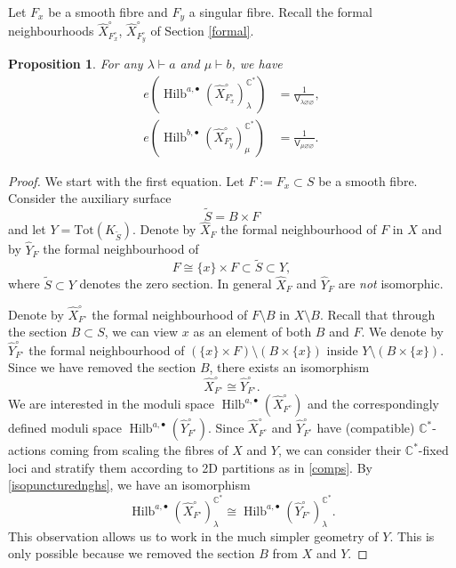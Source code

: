 \documentclass{amsart}
\newtheorem{proposition}[theorem]{Proposition}
\theoremstyle{definition}
\newcommand{\CC} {\mathbb{C}}          %
\newcommand{\sfV}{\mathsf{V}}
\newcommand{\Hilb}{\operatorname{Hilb}}
\newcommand{\Xhat}{\widehat{X}}
\begin{document}
Let $F_x$ be a smooth fibre and $F_y$ a singular fibre. Recall the formal neighbourhoods $\Xhat ^{\circ}_{F_{x}^{\circ}}$,  $\Xhat ^{\circ}_{F_{y}^{\circ}}$ of Section \ref{formal}.
\begin{proposition} \label{vertex2}
For any $\lambda \vdash a$ and $\mu \vdash b$, we have
\begin{align*}
e(\Hilb^{a,\bullet}(\Xhat ^{\circ}_{F_{x}^{\circ}})_{\lambda}^{\CC^*}) &= \frac{1}{\sfV_{\lambda\varnothing\varnothing}}, \\
e(\Hilb^{b,\bullet}(\Xhat ^{\circ}_{F_{y}^{\circ}})_{\mu}^{\CC^*}) &= \frac{1}{\sfV_{\mu\varnothing\varnothing}}.
\end{align*}
\end{proposition}
\begin{proof}
We start with the first equation. Let $F := F_x \subset S$ be a smooth fibre. Consider the auxiliary surface 
$$
\tilde{S} = B \times F
$$ 
and let $Y = \mathrm{Tot}(K_{\tilde{S}})$. 
Denote by $\Xhat _F$ the formal neighbourhood of $F$ in $X$ and by $\widehat{Y}_{F}$ the formal neighbourhood of
$$
F \cong \{x\} \times F \subset \tilde{S} \subset Y,
$$
where $\tilde{S} \subset Y$ denotes the zero section. In general $\Xhat _F$ and $\widehat{Y}_{F}$ are \emph{not} isomorphic. 

Denote by $\Xhat ^{\circ}_{F^\circ}$ the formal neighbourhood of $F \setminus B$ in $X \setminus B$. Recall that through the section $B \subset S$, we can view $x$ as an element of both $B$ and $F$.  We denote by $\widehat{Y}_{F^{\circ}}^{\circ}$ the formal neighbourhood of $(\{x\} \times F) \setminus (B \times \{x\})$ inside $Y \setminus (B \times \{x\})$. Since we have removed the section $B$, there exists an isomorphism  
\begin{equation} \label{isopuncturednghs}
\Xhat ^{\circ}_{F^\circ} \cong \widehat{Y}_{F^{\circ}}^{\circ}.
\end{equation}
We are interested in the moduli space $\Hilb^{a,\bullet}(\Xhat ^{\circ}_{F^\circ})$ and the correspondingly defined moduli space $\Hilb^{a,\bullet}(\widehat{Y}^{\circ}_{F^\circ})$. Since $\Xhat ^{\circ}_{F^\circ}$ and $\widehat{Y}^{\circ}_{F^\circ}$ have (compatible) $\CC^*$-actions coming from scaling the fibres of $X$ and $Y$, we can consider their $\CC^*$-fixed loci and stratify them according to 2D partitions as in \eqref{comps}. By \eqref{isopuncturednghs}, we have an isomorphism   
$$
\Hilb^{a,\bullet}(\Xhat ^{\circ}_{F^\circ})_{\lambda}^{\CC^*} \cong \Hilb^{a,\bullet}(\widehat{Y}^{\circ}_{F^\circ})_{\lambda}^{\CC^*}.
$$
This observation allows us to work in the much simpler geometry of $Y$. This is only possible because we removed the section $B$ from $X$ and $Y$.


\end{proof}
\end{document}
